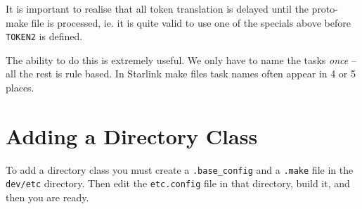 It is important to realise that all token translation is delayed until
the proto-make file is processed, ie. it is quite valid to use one of
the specials above before \verb+TOKEN2+ is defined.

The ability to do this is extremely useful. We only have to name the tasks
{\em once} -- all the rest is rule based. In Starlink make files task names
often appear in 4 or 5 places. 

\section{Adding a Directory Class}

To add a directory class you must create a \verb+.base_config+ and a
\verb+.make+ file in the \verb+dev/etc+ directory. Then edit the 
\verb+etc.config+ file in that directory, build it, and then you are
ready. 


